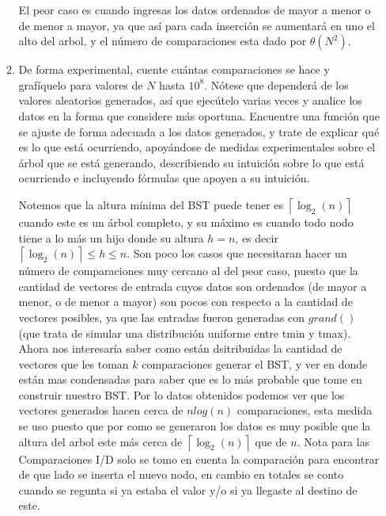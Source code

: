 \documentclass[letterpaper]{article}
\theoremstyle{definition}
\theoremstyle{lemathm}
\theoremstyle{lemathm}
\theoremstyle{lemathm}
\theoremstyle{lemademthm}
\newcommand{\ceil}[1]{\left \lceil #1 \right\rceil }
\newcommand{\1}{\mathbbm{1}}
\begin{document}
\begin{enumerate}[label=\textbf{Problema \arabic*}]
\begin{enumerate}
			El peor caso es cuando ingresas los datos ordenados de mayor a menor o de menor a mayor, ya que así para cada inserción se aumentará en uno el alto del arbol, y el número de comparaciones esta dado por $\theta(N^2)$.

			\item De forma experimental, cuente cuántas comparaciones se hace y grafíquelo para valores de $N$ hasta $10^{8}$. Nótese que dependerá de los valores aleatorios generados, así que ejecútelo varias veces y analice los datos en la forma que considere más oportuna. Encuentre una función que se ajuste de forma adecuada a los datos generados, y trate de explicar qué es lo que está ocurriendo, apoyándose de medidas experimentales sobre el árbol que se está generando, describiendo su intuición sobre lo que está ocurriendo e incluyendo fórmulas que apoyen a su intuición.
			
			Notemos que la altura mínima del BST puede tener es $\ceil{\log_2(n)}$ cuando este es un árbol completo, y su máximo es cuando todo nodo tiene a lo más un hijo donde su altura $h = n$, es decir $\ceil{\log_2(n)} \leq h \leq n$. Son poco los casos que necesitaran hacer un número de comparaciones muy cercano al del peor caso, puesto que la cantidad de vectores de entrada cuyos datos son ordenados (de mayor a menor, o de menor a mayor) son pocos con respecto a la cantidad de vectores posibles, ya que las entradas fueron generadas con $grand()$ (que trata de simular una distribución uniforme entre tmin y tmax). Ahora nos interesaría saber como están dsitribuidas la cantidad de vectores que les toman $k$ comparaciones generar el BST, y ver en donde están mas condensadas para saber que es lo más probable que tome en construir nuestro BST. Por lo datos obtenidos podemos ver que los vectores generados hacen cerca de $nlog(n)$ comparaciones, esta medida se uso puesto que por como se generaron los datos es muy posible que la altura del arbol este más cerca de $\ceil{\log_2(n)}$ que de $n$. Nota para las Comparaciones I/D solo se tomo en cuenta la comparación para encontrar de que lado se inserta el nuevo nodo, en cambio en totales se conto cuando se regunta si ya estaba el valor y/o si ya llegaste al destino de este.


\end{enumerate}
\end{enumerate}
\end{document}
